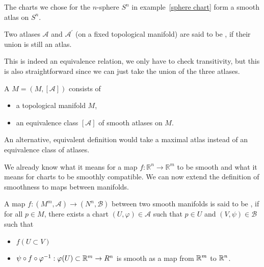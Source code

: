 \documentclass[a4paper,11pt]{article}
\begin{document}
\begin{example}
    The charts we chose for the \(n\)-sphere \(S^n\) in example\ \ref{sphere chart} form a smooth atlas on \(S^n\).
\end{example}

\begin{definition}\label{equivalence atlas}
    Two atlases \(\mathcal{A}\) and \(\mathcal{A}^\prime\) (on a fixed topological manifold) are said to be , if their union is still an atlas.
\end{definition}

\begin{remark}
    This is indeed an equivalence relation, we only have to check transitivity, but this is also straightforward since we can just take the union of the three atlases.
\end{remark}


\begin{definition}
    A  \(M=(M,[\mathcal{A}])\) consists of
    \begin{itemize}
        \item a topological manifold \(M\),
        \item an equivalence class \([\mathcal{A}]\) of smooth atlases on \(M\).
    \end{itemize}
\end{definition}

\begin{remark}
    An alternative, equivalent definition would take a maximal atlas instead of an equivalence class of atlases.
\end{remark}

We already know what it means for a map \(f:\mathbb{R}^n\to\mathbb{R}^m\) to be smooth and what it means for charts to be smoothly compatible. We can now extend the definition of smoothness to maps between manifolds.

\begin{definition}
    A map \(f:(M^m,\mathcal{A})\to (N^n,\mathcal{B})\) between two smooth manifolds is said to be , if for all \(p\in M\), there exists a chart \((U,\varphi)\in\mathcal{A}\) such that \(p\in U\) and \((V,\psi)\in\mathcal{B}\) such that
    \begin{itemize}
        \item \(f(U\subset V)\)
        \item \(\psi\circ f\circ \varphi^{-1}:\varphi(U)\subset \mathbb{R}^m\to R^n\) is smooth as a map from \(\mathbb{R}^m\) to \(\mathbb{R}^n\).
    \end{itemize}
\end{definition}
\end{document}

